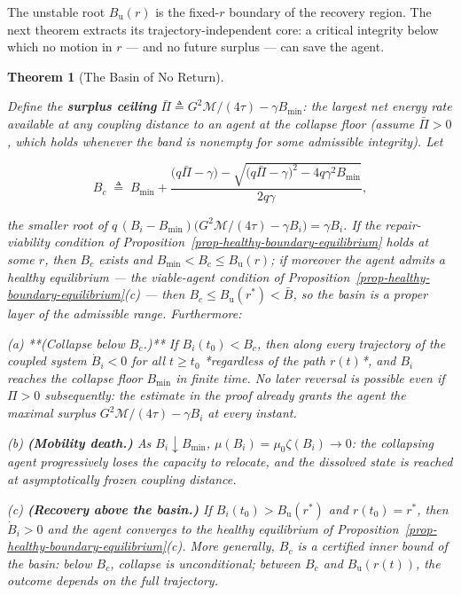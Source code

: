 \documentclass[11pt]{article}
\theoremstyle{plain}
\newtheorem{theorem}{Theorem}
\theoremstyle{definition}
\theoremstyle{remark}
\newcounter{none}
\begin{document}
The unstable root \(B_{\mathrm{u}}(r)\) is the fixed-\(r\) boundary of
the recovery region. The next theorem extracts its
trajectory-independent core: a critical integrity below which no motion
in \(r\) --- and no future surplus --- can save the agent.

\begin{theorem}[The Basin of No Return]
\label{thm-basin-of-no-return}

Define the \textbf{surplus ceiling} $\bar{\Pi} \triangleq G^2\mathcal{M}/(4\tau) - \gamma B_{\min}$: the largest net energy rate available at any coupling distance to an agent at the collapse floor (assume $\bar{\Pi} > 0$, which holds whenever the band is nonempty for some admissible integrity). Let

$$B_c \;\triangleq\; B_{\min} + \frac{\bigl(q\bar{\Pi} - \gamma\bigr) - \sqrt{\bigl(q\bar{\Pi} - \gamma\bigr)^2 - 4 q \gamma^2 B_{\min}}}{2 q \gamma},$$

the smaller root of $q\,(B_i - B_{\min})\bigl(G^2\mathcal{M}/(4\tau) - \gamma B_i\bigr) = \gamma B_i$. If the repair-viability condition of Proposition~\ref{prop-healthy-boundary-equilibrium} holds at some $r$, then $B_c$ exists and $B_{\min} < B_c \leq B_{\mathrm{u}}(r)$; if moreover the agent admits a healthy equilibrium — the viable-agent condition of Proposition~\ref{prop-healthy-boundary-equilibrium}(c) — then $B_c \leq B_{\mathrm{u}}(r^*) < \bar{B}$, so the basin is a proper layer of the admissible range. Furthermore:

(a) **(Collapse below $B_c$.)** If $B_i(t_0) < B_c$, then along every trajectory of the coupled system $\dot{B}_i < 0$ for all $t \geq t_0$ *regardless of the path $r(t)$*, and $B_i$ reaches the collapse floor $B_{\min}$ in finite time. No later reversal is possible even if $\Pi > 0$ subsequently: the estimate in the proof already grants the agent the maximal surplus $G^2\mathcal{M}/(4\tau) - \gamma B_i$ at every instant.

(b) \textbf{(Mobility death.)} As $B_i \downarrow B_{\min}$, $\mu(B_i) = \mu_0 \zeta(B_i) \to 0$: the collapsing agent progressively loses the capacity to relocate, and the dissolved state is reached at asymptotically frozen coupling distance.

(c) \textbf{(Recovery above the basin.)} If $B_i(t_0) > B_{\mathrm{u}}(r^*)$ and $r(t_0) = r^*$, then $\dot{B}_i > 0$ and the agent converges to the healthy equilibrium of Proposition~\ref{prop-healthy-boundary-equilibrium}(c). More generally, $B_c$ is a certified inner bound of the basin: below $B_c$, collapse is unconditional; between $B_c$ and $B_{\mathrm{u}}(r(t))$, the outcome depends on the full trajectory.
\end{theorem}
\end{document}
